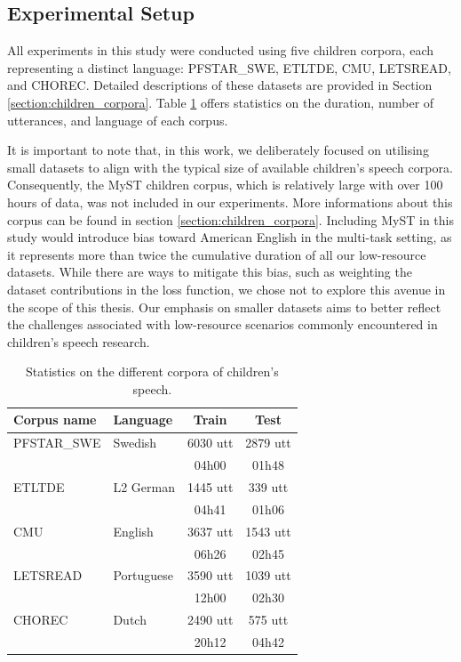 \subsection{Experimental Setup}
\label{section:corpus}
All experiments in this study were conducted using five children corpora, each representing a distinct language: PFSTAR\_SWE, ETLTDE, CMU, LETSREAD, and CHOREC. Detailed descriptions of these datasets are provided in Section \ref{section:children_corpora}. Table \ref{tab:statistics} offers statistics on the duration, number of utterances, and language of each corpus.

It is important to note that, in this work, we deliberately focused on utilising small datasets to align with the typical size of available children's speech corpora. Consequently, the MyST children corpus, which is relatively large with over 100 hours of data, was not included in our experiments. More informations about this corpus can be found in section \ref{section:children_corpora}. Including MyST in this study would introduce bias toward American English in the multi-task setting, as it represents more than twice the cumulative duration of all our low-resource datasets. While there are ways to mitigate this bias, such as weighting the dataset contributions in the loss function, we chose not to explore this avenue in the scope of this thesis. Our emphasis on smaller datasets aims to better reflect the challenges associated with low-resource scenarios commonly encountered in children's speech research.


\begin{table}[ht]
\begin{center}
\begin{tabular}{llcc}
\hline
Corpus name & Language     & Train & Test  \\ \hline
\multicolumn{1}{l}{PFSTAR\_SWE} & Swedish             & 6030 utt  & 2879 utt  \\ 
\multicolumn{1}{l}{} &              & 04h00 & 01h48 \\\hline
\multicolumn{1}{l}{ETLTDE}      & L2 German   & 1445 utt &  339 utt \\ 
\multicolumn{1}{l}{}      &    &  04h41 & 01h06 \\ \hline
\multicolumn{1}{l}{CMU}         & English             & 3637 utt & 1543 utt \\ 
\multicolumn{1}{l}{}         &              & 06h26 & 02h45  \\ \hline
\multicolumn{1}{l}{LETSREAD}    & Portuguese & 3590 utt & 1039 utt \\ 
\multicolumn{1}{l}{}    &  & 12h00 & 02h30 \\  \hline
\multicolumn{1}{l}{CHOREC}      & Dutch               & 2490 utt & 575 utt  \\ 
\multicolumn{1}{l}{}      &                &  20h12 & 04h42 \\ \hline
\end{tabular}
\caption{Statistics on the different corpora of children's speech.}
\label{tab:statistics}
\end{center}
\end{table}


